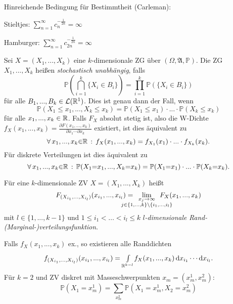 \documentclass{cheat-sheet}
\newcommand{\Alg}{\mathfrak{A}} %
\renewcommand{\P}{\mathbb{P}} %
\begin{document}
\begin{antwort}
  Hinreichende Bedingung für Bestimmtheit (Carleman):
  \begin{itemize}
    \begin{multicols}{2}
      \item Stieltjes: $\sum_{n=1}^\infty c_{n}^{-\tfrac{1}{2n}} = \infty$
      \item Hamburger: $\sum_{n=1}^\infty c_{2n}^{-\tfrac{1}{2n}} = \infty$
    \end{multicols}
  \end{itemize}
\end{antwort}




\begin{bem}
  Sei $X = (X_1, ..., X_k)$ eine $k$-dimensionale ZG über $(\Omega, \Alg, \P)$. Die ZG $X_1, ..., X_k$ heißen \emph{stochastisch unabhängig}, falls
  \[ \P(\bigcap_{i=1}^k \{ X_i \in B_i \}) = \prod_{i=1}^k \P(\{ X_i \in B_i \}) \]
  für alle $B_1, ..., B_k \in \mathcal{L}(\mathbb{R}^1)$. Dies ist genau dann der Fall, wenn
  \[ \P(X_1 \leq x_1, ..., X_k \leq x_k) = \P(X_1 \leq x_1) \cdot ... \cdot \P(X_k \leq x_k) \]
  für alle $x_1, ..., x_k \in \mathbb{R}$. Falls $F_X$ absolut stetig ist, also die W-Dichte $f_X(x_1, ..., x_k) = \tfrac{\partial F(x_1, ..., x_k)}{\partial x_1 \cdots \partial x_k}$ existiert, ist dies äquivalent zu
  \[ \forall \, {x_1, ..., x_k {\in} \mathbb{R}} \,:\, f_X(x_1, ..., x_k) = f_{X_1}(x_1) \cdot ... \cdot f_{X_k}(x_k). \]
  Für diskrete Verteilungen ist dies äquivalent zu
  \[ \fa{x_1, ..., x_k {\in} \R} \P(X_1 {=} x_1, ..., X_k {=} x_k) = \P(X_1 {=} x_1) \cdot ... \cdot \P(X_k {=} x_k). \]
\end{bem}

\begin{defn}
  Für eine $k$-dimensionale ZV $X = (X_1, ..., X_k)$ heißt
  \[ F_{(X_{i_1}, ..., X_{i_l})}(x_{i_1}, ..., x_{i_l}) = \quad \lim_{\mathclap{\substack{x_j \to \infty \\ j \in \{ 1, ..., k\} \setminus \{ i_1, ..., i_l \}}}} \quad F_{X}(x_1, ..., x_k) \]
  mit $l \in \{1, ..., k{-}1 \}$ und $1 \leq i_1 < ... < i_l \leq k$ \emph{$l$-dimensionale Rand-(Marginal-)verteilungsfunktion}.
\end{defn}

\begin{bem}
  Falls $f_X(x_1, ..., x_k)$ ex., so existieren alle Randdichten
  \[ f_{(X_{i_1}, ..., X_{i_l})}(x_{i_1}, ..., x_{i_l}) = {\textstyle \int\limits_{\mathbb{R}^{k{-}l}}^{}} f_{X}(x_1, ..., x_k) \,\mathrm{d} x_{i_1} \cdots \mathrm{d} x_{i_l}. \]
  Für $k{=}2$ und ZV diskret mit Masseschwerpunkten $x_m = (x_m^{1}, x_m^{2})$:
  \[ \P(X_1 = x_m^{1}) = \sum_{x_m^{2}} \P(X_1 = x_m^{1}, X_2 = x_m^{2}) \]
\end{bem}
\end{document}
